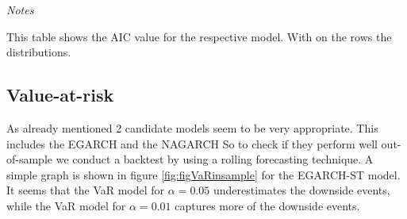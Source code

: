 \documentclass[a4paper, twoside]{templates/ociamthesis}
\begin{document}
\begin{table}[h!]

\caption{\label{tab:aicTable}Model selection according to AIC}
\centering
\begin{threeparttable}
\begin{tablenotes}
\item \textit{Notes} 
\item This table shows the AIC value for the respective model. With on the rows the distributions. 
\end{tablenotes}
\end{threeparttable}
\end{table}

\clearpage
\newpage

\hypertarget{value-at-risk-1}{%
\subsection{Value-at-risk}\label{value-at-risk-1}}

\noindent As already mentioned 2 candidate models seem to be very appropriate. This includes the EGARCH and the NAGARCH So to check if they perform well out-of-sample we conduct a backtest by using a rolling forecasting technique. A simple graph is shown in figure \ref{fig:figVaRinsample} for the EGARCH-ST model. It seems that the VaR model for \(\alpha=0.05\) underestimates the downside events, while the VaR model for \(\alpha=0.01\) captures more of the downside events.
\end{document}
